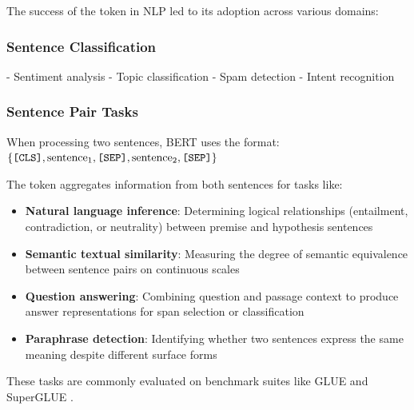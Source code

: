 The success of the \cls{} token in NLP led to its adoption across various domains:

\subsubsection{Sentence Classification}
- Sentiment analysis
- Topic classification  
- Spam detection
- Intent recognition

\subsubsection{Sentence Pair Tasks}
When processing two sentences, BERT uses the format:
$\{\texttt{[CLS]}{}, \text{sentence}_1, \texttt{[SEP]}{}, \text{sentence}_2, \texttt{[SEP]}{}\}$

The \cls{} token aggregates information from both sentences for tasks like:
\begin{itemize}
\item \textbf{Natural language inference}: Determining logical relationships (entailment, contradiction, or neutrality) between premise and hypothesis sentences
\item \textbf{Semantic textual similarity}: Measuring the degree of semantic equivalence between sentence pairs on continuous scales
\item \textbf{Question answering}: Combining question and passage context to produce answer representations for span selection or classification
\item \textbf{Paraphrase detection}: Identifying whether two sentences express the same meaning despite different surface forms
\end{itemize}

These tasks are commonly evaluated on benchmark suites like GLUE \citep{wang2018glue} and SuperGLUE \citep{wang2019superglue}.

